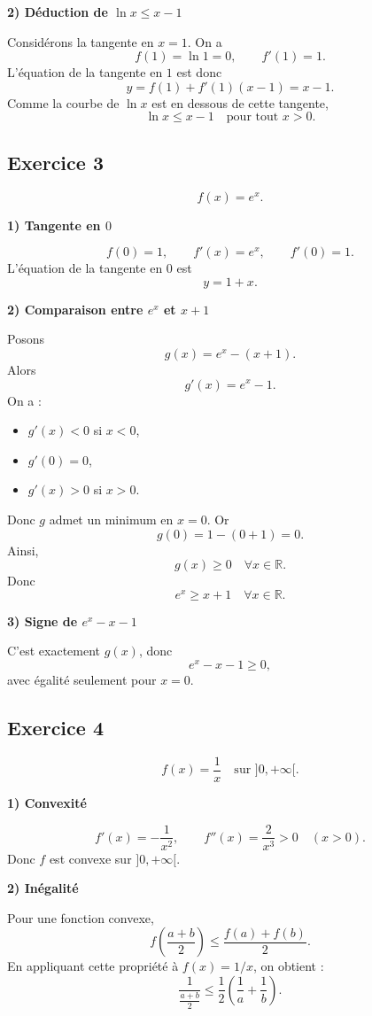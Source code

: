\documentclass[11pt,a4paper]{article}
\newcommand{\R}{\mathbb{R}}
\begin{document}
\textbf{2) Déduction de \(\ln x\leq x-1\)}

Considérons la tangente en \(x=1\).  
On a
\[
f(1)=\ln 1=0,\qquad f'(1)=1.
\]
L'équation de la tangente en \(1\) est donc
\[
y=f(1)+f'(1)(x-1)=x-1.
\]
Comme la courbe de \(\ln x\) est en dessous de cette tangente,
\[
\boxed{\ln x\leq x-1 \quad \text{pour tout } x>0.}
\]

\subsection*{Exercice 3}
\[
f(x)=e^x.
\]

\textbf{1) Tangente en \(0\)}

\[
f(0)=1,\qquad f'(x)=e^x,\qquad f'(0)=1.
\]
L'équation de la tangente en \(0\) est
\[
y=1+x.
\]

\textbf{2) Comparaison entre \(e^x\) et \(x+1\)}

Posons
\[
g(x)=e^x-(x+1).
\]
Alors
\[
g'(x)=e^x-1.
\]
On a :
\begin{itemize}
    \item \(g'(x)<0\) si \(x<0\),
    \item \(g'(0)=0\),
    \item \(g'(x)>0\) si \(x>0\).
\end{itemize}
Donc \(g\) admet un minimum en \(x=0\). Or
\[
g(0)=1-(0+1)=0.
\]
Ainsi,
\[
g(x)\geq 0 \quad \forall x\in\R.
\]
Donc
\[
\boxed{e^x\geq x+1 \quad \forall x\in\R.}
\]

\textbf{3) Signe de \(e^x-x-1\)}

C'est exactement \(g(x)\), donc
\[
\boxed{e^x-x-1\geq 0,}
\]
avec égalité seulement pour \(x=0\).

\subsection*{Exercice 4}
\[
f(x)=\frac1x \quad \text{sur } ]0,+\infty[.
\]

\textbf{1) Convexité}

\[
f'(x)=-\frac1{x^2},\qquad f''(x)=\frac{2}{x^3}>0 \quad (x>0).
\]
Donc \(f\) est convexe sur \(]0,+\infty[\).

\textbf{2) Inégalité}

Pour une fonction convexe,
\[
f\left(\frac{a+b}{2}\right)\leq \frac{f(a)+f(b)}{2}.
\]
En appliquant cette propriété à \(f(x)=1/x\), on obtient :
\[
\frac{1}{\frac{a+b}{2}} \leq \frac12\left(\frac1a+\frac1b\right).
\]
\end{document}
